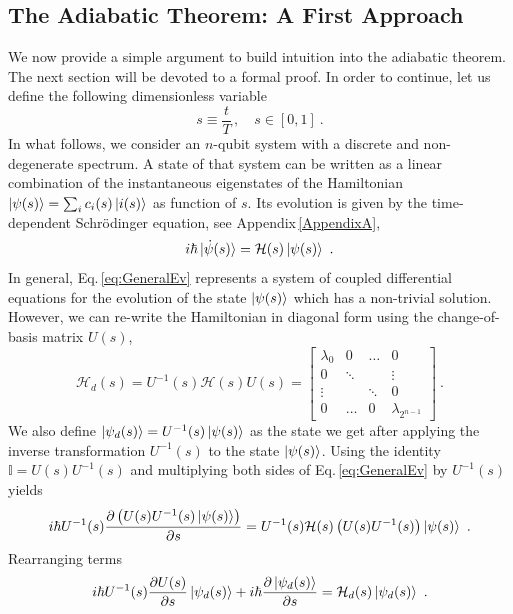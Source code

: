 \subsection{The Adiabatic Theorem: A First Approach}
We now provide a simple argument to build intuition into the adiabatic theorem. The next section will be devoted to a formal proof. In order to continue, let us define the following dimensionless variable
\begin{equation}
    s \equiv \frac{t}{T}\, , \quad s \in [0,1]\ .
\end{equation}
In what follows, we consider an $n$-qubit system with a discrete and non-degenerate spectrum. A state of that system can be written as a linear combination of the instantaneous eigenstates of the Hamiltonian $\ket{\psi(s)} = \sum_{i}c_{i}(s)\ket{i(s)}$ as function of $s$. Its evolution is given by the time-dependent Schrödinger equation, see Appendix\,\ref{AppendixA},
\begin{equation}
\label{eq:GeneralEv}
    i\hbar \ket{\dot{\psi}(s)} = \mathcal{H}(s) \ket{\psi(s)}\ .
\end{equation}
In general, Eq.\,\eqref{eq:GeneralEv} represents a system of coupled differential equations for the evolution of the state $\ket{\psi(s)}$ which has a non-trivial solution. However, we can re-write the Hamiltonian in diagonal form using the change-of-basis matrix $U(s)$,
\begin{equation}
    \mathcal{H}_{d}(s) = U^{-1}(s)\mathcal{H}(s)U(s) = \begin{bmatrix}
           \lambda_{0} & 0 & \hdots & 0 \\
           0 &  \ddots & & \vdots \\
           \vdots &   & \ddots & 0 \\
           0 & \hdots & 0 & \lambda_{2^{n-1}}
         \end{bmatrix}\ .
\end{equation}
We also define $\ket{\psi_{d}(s)} = U^{-1}(s)\ket{\psi(s)}$ as the state we get after applying the inverse transformation $U^{-1}(s)$ to the state $\ket{\psi(s)}$. Using the identity $\mathbb{I} = U(s)U^{-1}(s)$ and multiplying both sides of Eq.\,\eqref{eq:GeneralEv} by $U^{-1}(s)$ yields
\begin{equation}
     i\hbar U^{-1}(s) \frac{\partial \left(U(s)U^{-1}(s)\ket{\psi(s)}\right)}{\partial s} = U^{-1}(s)\mathcal{H}(s) \left(U(s)U^{-1}(s)\right)\ket{\psi(s)}\ .
\end{equation}
Rearranging terms
\begin{equation}
     i\hbar U^{-1}(s) \frac{\partial U(s)}{\partial s}\ket{\psi_{d}(s)} + i\hbar  \frac{\partial \ket{\psi_{d}(s)}}{\partial s}= \mathcal{H}_{d}(s)\ket{\psi_{d}(s)}\ .
\end{equation}

